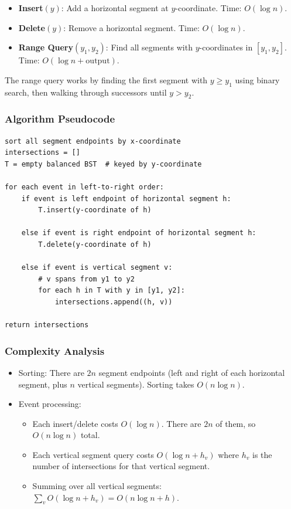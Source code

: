 \documentclass[11pt]{article}
\begin{document}
\begin{itemize}
\item \textbf{Insert}$(y)$: Add a horizontal segment at $y$-coordinate. Time: $O(\log n)$.
\item \textbf{Delete}$(y)$: Remove a horizontal segment. Time: $O(\log n)$.
\item \textbf{Range Query}$(y_1, y_2)$: Find all segments with $y$-coordinates in $[y_1, y_2]$. Time: $O(\log n + \text{output})$.
\end{itemize}

The range query works by finding the first segment with $y \ge y_1$ using binary search, then walking through successors until $y > y_2$.

\subsubsection*{Algorithm Pseudocode}
\begin{lstlisting}
sort all segment endpoints by x-coordinate
intersections = []
T = empty balanced BST  # keyed by y-coordinate

for each event in left-to-right order:
    if event is left endpoint of horizontal segment h:
        T.insert(y-coordinate of h)
    
    else if event is right endpoint of horizontal segment h:
        T.delete(y-coordinate of h)
    
    else if event is vertical segment v:
        # v spans from y1 to y2
        for each h in T with y in [y1, y2]:
            intersections.append((h, v))

return intersections
\end{lstlisting}

\subsubsection*{Complexity Analysis}
\begin{itemize}
\item Sorting: There are $2n$ segment endpoints (left and right of each horizontal segment, plus $n$ vertical segments). Sorting takes $O(n \log n)$.
\item Event processing: 
  \begin{itemize}
  \item Each insert/delete costs $O(\log n)$. There are $2n$ of them, so $O(n \log n)$ total.
  \item Each vertical segment query costs $O(\log n + h_v)$ where $h_v$ is the number of intersections for that vertical segment.
  \item Summing over all vertical segments: $\sum_v O(\log n + h_v) = O(n \log n + h)$.
  \end{itemize}
\end{itemize}
\end{document}
